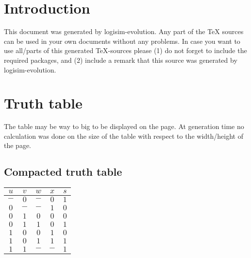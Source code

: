 \documentclass [15pt,a4paper,twoside]{article}
\begin{document}
\section{Introduction}
This document was generated by logisim-evolution. Any part of the TeX sources can be used in your own documents without any problems. In case you want to use all/parts of this generated TeX-sources please (1) do not forget to include the required packages, and (2) include a remark that this source was generated by logisim-evolution.
\section{Truth table}
The table may be way to big to be displayed on the page. At generation time no calculation was done on the size of the table with respect to the width/height of the page.
\subsection{Compacted truth table}
\begin{center}
\begin{tabular}{cccc|c}
$u$&$v$&$w$&$x$&$s$\\
\hline
$-$&$0$&$-$&$0$&$1$\\
$0$&$-$&$-$&$1$&$0$\\
$0$&$1$&$0$&$0$&$0$\\
$0$&$1$&$1$&$0$&$1$\\
$1$&$0$&$0$&$1$&$0$\\
$1$&$0$&$1$&$1$&$1$\\
$1$&$1$&$-$&$-$&$1$\\

\end{tabular}
\end{center}
\end{document}
